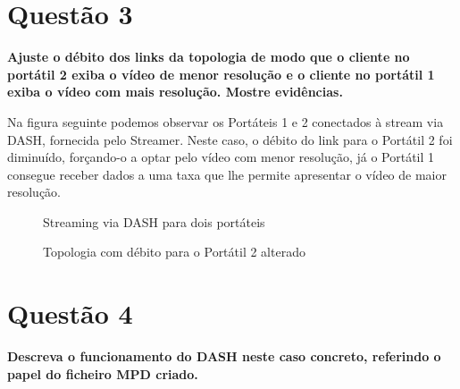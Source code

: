 \documentclass[a4paper, 11pt]{article}
\begin{document}
\section{Questão 3}
\textbf{Ajuste o débito dos links da topologia de modo que o cliente no portátil 2 exiba o vídeo de menor resolução e o cliente
no portátil 1 exiba o vídeo com mais resolução. Mostre evidências.}
\vspace{0.25cm}

Na figura seguinte podemos observar os Portáteis 1 e 2 conectados à stream via DASH, fornecida pelo Streamer. Neste caso, o débito do link para o Portátil 2 foi diminuído, forçando-o a optar pelo vídeo com menor resolução, já o Portátil 1 consegue receber dados a uma taxa que lhe permite apresentar o vídeo de maior resolução.

\begin{figure}[H]
    \centering
    \caption{Streaming via DASH para dois portáteis}
\end{figure}

\begin{figure}[H]
    \centering
    \caption{Topologia com débito para o Portátil 2 alterado}
\end{figure}

\section{Questão 4}
\textbf{Descreva o funcionamento do DASH neste caso concreto, referindo o papel do ficheiro MPD criado.}
\vspace{0.25cm}
\end{document}

